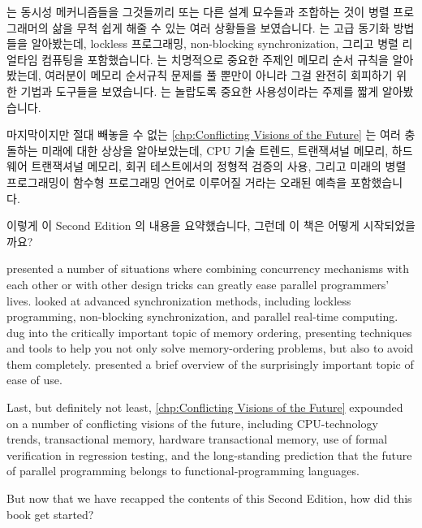\fi

 는 동시성 메커니즘들을 그것들끼리 또는 다른
설계 묘수들과 조합하는 것이 병렬 프로그래머의 삶을 무척 쉽게 해줄 수 있는 여러
상황들을 보였습니다.
 는 고급 동기화 방법들을 알아봤는데,
lockless 프로그래밍, non-blocking synchronization, 그리고 병렬 리얼타임
컴퓨팅을 포함했습니다.
 는 치명적으로 중요한
주제인 메모리 순서 규칙을 알아봤는데, 여러분이 메모리 순서규칙 문제를 풀 뿐만이
아니라 그걸 완전히 회피하기 위한 기법과 도구들을 보였습니다.
 는 놀랍도록 중요한 사용성이라는 주제를 짧게
알아봤습니다.

마지막이지만 절대 빼놓을 수 없는 \cref{chp:Conflicting Visions of the Future}
는 여러 충돌하는 미래에 대한 상상을 알아보았는데, CPU 기술 트렌드, 트랜잭셔널
메모리, 하드웨어 트랜잭셔널 메모리, 회귀 테스트에서의 정형적 검증의 사용,
그리고 미래의 병렬 프로그래밍이 함수형 프로그래밍 언어로 이루어질 거라는 오래된
예측을 포함했습니다.

이렇게 이 Second Edition 의 내용을 요약했습니다, 그런데 이 책은 어떻게
시작되었을까요?

\iffalse

 presented a number of situations
where combining concurrency mechanisms with each other or with other
design tricks can greatly ease parallel programmers' lives.
 looked at advanced
synchronization methods, including lockless programming, non-blocking
synchronization, and parallel real-time computing.
 dug into the
critically important topic of memory ordering, presenting techniques
and tools to help you not only solve memory-ordering problems, but
also to avoid them completely.
 presented a brief overview of the surprisingly
important topic of ease of use.

Last, but definitely not least, \cref{chp:Conflicting Visions of the Future}
expounded on a number of conflicting visions of the future, including
CPU-technology trends, transactional memory, hardware transactional
memory, use of formal verification in regression testing, and the
long-standing prediction that the future of parallel programming belongs
to functional-programming languages.

But now that we have recapped the contents of this Second Edition, how did
this book get started?

